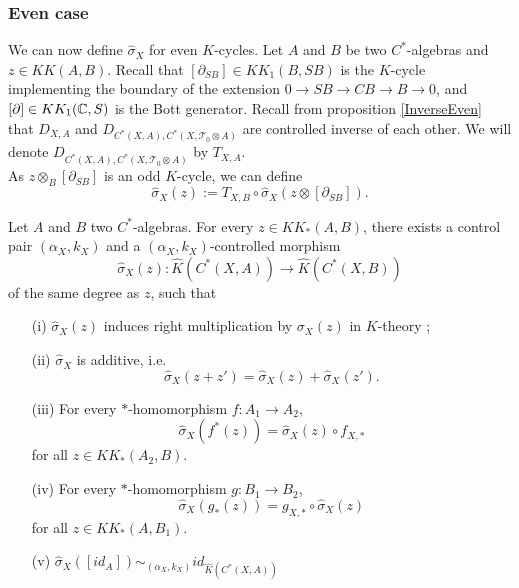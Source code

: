 \subsubsection{Even case} %

We can now define $\hat\sigma_X$ for even $K$-cycles. Let $A$ and $B$ be two $C^*$-algebras and $z\in KK(A,B)$. Recall that $[\partial_{SB}]\in KK_1(B,SB)$ is the $K$-cycle implementing the boundary of the extension $0\rightarrow SB\rightarrow CB\rightarrow B\rightarrow 0$, and $[\partial]\in KK_1(\mathbb C,S)$ is the Bott generator. Recall from proposition \ref{InverseEven} that $D_{X,A}$  and $D_{ C^*(X,A),C^*(X,\mathcal T_0\otimes A) }$ are controlled inverse of each other. We will denote $D_{ C^*(X,A),C^*(X,\mathcal T_0\otimes A) }$ by $T_{X,A}$.\\

As $z\otimes_B [\partial_{SB}]$ is an odd $K$-cycle, we can define
\[\hat\sigma_X(z):= T_{X,B}\circ \hat\sigma_X(z\otimes[\partial_{SB}]).\] 


\begin{prop}\label{Roe2}
Let $A$ and $B$ two $C^*$-algebras. For every $z\in KK_*(A,B)$, there exists a control pair $(\alpha_X,k_X)$ and a $(\alpha_X,k_X)$-controlled morphism
\[\hat\sigma_X(z) : \hat K(C^*(X,A))\rightarrow \hat K(C^*(X,B))\]
of the same degree as $z$, such that
\begin{enumerate}
\item[(i)] $\hat\sigma_X(z)$ induces right multiplication by $\sigma_X(z)$ in $K$-theory ;
\item[(ii)] $\hat\sigma_X$ is additive, i.e.
\[\hat\sigma_X(z+z')=\hat\sigma_X(z)+\hat\sigma_X(z').\]
\item[(iii)] For every $*$-homomorphism $f : A_1\rightarrow A_2$,
\[\hat\sigma_X(f^*(z))=\hat\sigma_X(z)\circ f_{X,*}\] for all $z\in KK_*(A_2,B)$.
\item[(iv)] For every $*$-homomorphism $g : B_1\rightarrow B_2$,
\[\hat\sigma_X(g_*(z))= g_{X,*}\circ \hat\sigma_X(z)\] for all $z\in KK_*(A,B_1)$.
\item[(v)] $\hat\sigma_X([id_A]) \sim_{(\alpha_X,k_X)} id_{\hat K(C^*(X,A))}$
\end{enumerate}
\end{prop}

